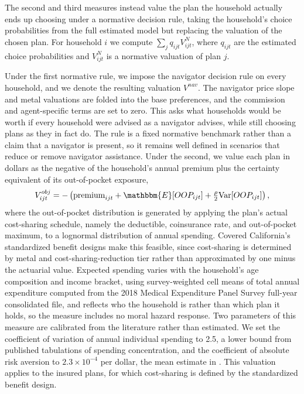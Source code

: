 \documentclass[12pt]{article}
\begin{document}
The second and third measures instead value the plan the household actually ends up choosing under a normative decision rule, taking the household's choice probabilities from the full estimated model but replacing the valuation of the chosen plan. For household $i$ we compute $\sum_j q_{ijt} V^N_{ijt}$, where $q_{ijt}$ are the estimated choice probabilities and $V^N_{ijt}$ is a normative valuation of plan $j$.

Under the first normative rule, we impose the navigator decision rule on every household, and we denote the resulting valuation $V^{nav}$. The navigator price slope and metal valuations are folded into the base preferences, and the commission and agent-specific terms are set to zero. This asks what households would be worth if every household were advised as a navigator advises, while still choosing plans as they in fact do. The rule is a fixed normative benchmark rather than a claim that a navigator is present, so it remains well defined in scenarios that reduce or remove navigator assistance. Under the second, we value each plan in dollars as the negative of the household's annual premium plus the certainty equivalent of its out-of-pocket exposure,
\begin{equation}
\label{eqn:obj_welfare}
V^{obj}_{ijt} = -\left( \text{premium}_{ijt} + \mathbbm{E}[OOP_{ijt}] + \tfrac{\rho}{2}\text{Var}[OOP_{ijt}] \right),
\end{equation}
where the out-of-pocket distribution is generated by applying the plan's actual cost-sharing schedule, namely the deductible, coinsurance rate, and out-of-pocket maximum, to a lognormal distribution of annual spending. Covered California's standardized benefit designs make this feasible, since cost-sharing is determined by metal and cost-sharing-reduction tier rather than approximated by one minus the actuarial value. Expected spending varies with the household's age composition and income bracket, using survey-weighted cell means of total annual expenditure computed from the 2018 Medical Expenditure Panel Survey full-year consolidated file, and reflects who the household is rather than which plan it holds, so the measure includes no moral hazard response. Two parameters of this measure are calibrated from the literature rather than estimated. We set the coefficient of variation of annual individual spending to 2.5, a lower bound from published tabulations of spending concentration, and the coefficient of absolute risk aversion to $2.3 \times 10^{-4}$ per dollar, the mean estimate in \cite{handel2013}. This valuation applies to the insured plans, for which cost-sharing is defined by the standardized benefit design.
\end{document}
